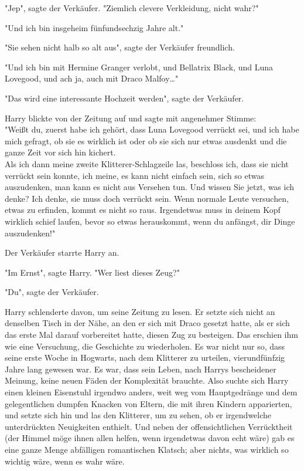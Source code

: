 {"Jep", sagte der Verkäufer. "Ziemlich clevere Verkleidung, nicht wahr?"

"Und ich bin insgeheim fünfundsechzig Jahre alt."

"Sie sehen nicht halb so alt aus", sagte der Verkäufer freundlich.

"Und ich bin mit Hermine Granger verlobt, und Bellatrix Black, und Luna Lovegood, und ach ja, auch mit Draco Malfoy…"

"Das wird eine interessante Hochzeit werden", sagte der Verkäufer.

Harry blickte von der Zeitung auf und sagte mit angenehmer Stimme:\\ "Weißt du, zuerst habe ich gehört, dass Luna Lovegood verrückt sei, und ich habe mich gefragt, ob sie es wirklich ist oder ob sie sich nur etwas ausdenkt und die ganze Zeit vor sich hin kichert.\\ Als ich dann meine zweite Klitterer-Schlagzeile las, beschloss ich, dass sie nicht verrückt sein konnte, ich meine, es kann nicht einfach sein, sich so etwas auszudenken, man kann es nicht aus Versehen tun. Und wissen Sie jetzt, was ich denke? Ich denke, sie muss doch verrückt sein. Wenn normale Leute versuchen, etwas zu erfinden, kommt es nicht so raus. Irgendetwas muss in deinem Kopf wirklich schief laufen, bevor so etwas herauskommt, wenn du anfängst, dir Dinge auszudenken!"

Der Verkäufer starrte Harry an.

"Im Ernst", sagte Harry. "Wer liest dieses Zeug?"

"Du", sagte der Verkäufer.

Harry schlenderte davon, um seine Zeitung zu lesen. Er setzte sich nicht an denselben Tisch in der Nähe, an den er sich mit Draco gesetzt hatte, als er sich das erste Mal darauf vorbereitet hatte, diesen Zug zu besteigen. Das erschien ihm wie eine Versuchung, die Geschichte zu wiederholen. Es war nicht nur so, dass seine erste Woche in Hogwarts, nach dem Klitterer zu urteilen, vierundfünfzig Jahre lang gewesen war. Es war, dass sein Leben, nach Harrys bescheidener Meinung, keine neuen Fäden der Komplexität brauchte. Also suchte sich Harry einen kleinen Eisenstuhl irgendwo anders, weit weg vom Hauptgedränge und dem gelegentlichen dumpfen Knacken von Eltern, die mit ihren Kindern apparierten, und setzte sich hin und las den Klitterer, um zu sehen, ob er irgendwelche unterdrückten Neuigkeiten enthielt. Und neben der offensichtlichen Verrücktheit (der Himmel möge ihnen allen helfen, wenn irgendetwas davon echt wäre) gab es eine ganze Menge abfälligen romantischen Klatsch; aber nichts, was wirklich so wichtig wäre, wenn es wahr wäre.

}

